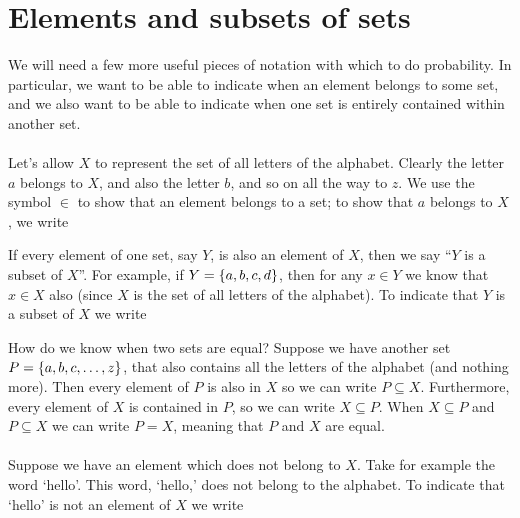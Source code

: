 \section{Elements and subsets of sets}
We will need a few more useful pieces of notation with which to do probability. In particular, we want to be able to indicate when an element belongs to some set, and we also want to be able to indicate when one set is entirely contained within another set. \\ \\
Let's allow $X$ to represent the set of all letters of the alphabet. Clearly the letter $a$ belongs to $X$, and also the letter $b$, and so on all the way to $z$. We use the symbol $\in$ to show that an element belongs to a set; to show that $a$ belongs to $X$, we write \label{symbin}
	
	\bigskip
	
	\hfil{}
	\bigskip

\noindent If every element of one set, say $Y$, is also an element of $X$, then we say ``$Y$ is a subset of $X$''. For example, if $Y = \left\{a,b,c,d\right\}$, then for any $x \in Y$ we know that $x \in X$ also (since $X$ is the set of all letters of the alphabet). To indicate that $Y$ is a subset of $X$ we write \label{symbsubseteq} \label{subset}
	\bigskip
	
	\hfil{}
	\bigskip

\noindent How do we know when two sets are equal? Suppose we have another set $P = \left\{a,b,c,\ldots,z\right\}$, that also contains all the letters of the alphabet (and nothing more). Then every element of $P$ is also in $X$ so we can write $P \subseteq X$. Furthermore, every element of $X$ is contained in $P$, so we can write $X \subseteq P$. When $X \subseteq P$ and $P \subseteq X$ we can write $P = X$, meaning that $P$ and $X$ are equal. \\ \\
Suppose we have an element which does not belong to $X$. Take for example the word `hello'. This word, `hello,' does not belong to the alphabet. To indicate that `hello' is not an element of $X$ we write  \label{symbnotin}
	\bigskip
	
